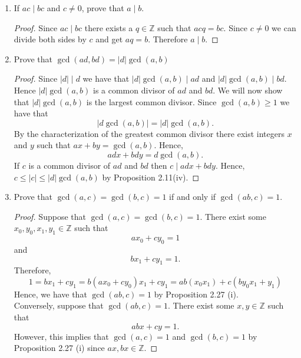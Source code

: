 \documentclass[12pt,letterpaper]{article}
\newcommand{\zz}{\mathbb Z}    %
\theoremstyle{plain}
\theoremstyle{definition}
\begin{document}
\begin{enumerate}[{\bf1.}]
\item If $ac\mid bc$ and $c\neq 0$, prove that $a\mid b$. 
\begin{proof}
Since $ac\mid bc$ there exists a $q\in \zz$ such that $acq=bc$. Since $c\neq 0$ we can divide both sides by $c$ and get $aq=b$. Therefore $a\mid b$. 
\end{proof}
\item Prove that $\gcd(ad,bd)=|d|\gcd(a,b)$
\begin{proof}
Since $|d|\mid d$ we have that $|d|\gcd(a,b)\mid ad$ and $|d|\gcd(a,b)\mid bd$. Hence $|d|\gcd(a,b)$ is a common divisor of $ad$ and $bd$. We will now show that $|d|\gcd(a,b)$ is the largest common divisor. Since $\gcd(a,b)\geq 1$ we have that 
\[|d\gcd(a,b)|= |d|\gcd(a,b).\] 
By the characterization of the greatest common divisor there exist integers $x$ and $y$ such that $ax+by=\gcd(a,b)$. Hence,
\[adx+bdy=d\gcd(a,b).\]
If $c$ is a common divisor of $ad$ and $bd$ then $c\mid adx+bdy$. Hence, $c\leq |c|\leq |d|\gcd(a,b)$ by Proposition 2.11(iv).
\end{proof}
\item Prove that $\gcd(a,c)=\gcd(b,c)=1$ if and only if $\gcd(ab,c)=1$. 
\begin{proof} Suppose that $\gcd(a,c)=\gcd(b,c)=1$. There exist some $x_0, y_0, x_1, y_1\in \zz$ such that 
\[ax_0+cy_0=1\] and \[bx_1+cy_1=1.\]
Therefore,
\[1=bx_1+cy_1=b(ax_0+cy_0)x_1+cy_1=ab(x_0x_1)+c(by_0x_1+y_1)\]
Hence, we have that $\gcd(ab,c)=1$ by Proposition 2.27 (i).\\

Conversely, suppose that $\gcd(ab,c)=1$. There exist some $x,y\in \zz$ such that 
\[abx+cy=1.\]
However, this implies that $\gcd(a,c)=1$ and $\gcd(b,c)=1$ by Proposition 2.27 (i) since $ax, bx\in \zz$. 


\end{proof}
\end{enumerate}
\end{document}
